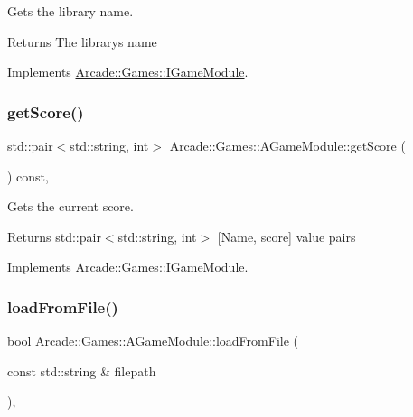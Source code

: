 Gets the library name. 

\begin{DoxyReturn}{Returns}
The library\textquotesingle{}s name 
\end{DoxyReturn}


Implements \mbox{\hyperlink{classArcade_1_1Games_1_1IGameModule_a30966cbaa00abbd2a211cf152ea595f2}{Arcade\+::\+Games\+::\+I\+Game\+Module}}.

\mbox{\label{classArcade_1_1Games_1_1AGameModule_a83dbf1572ae5e25174bc7b81fed7ba77}} 
\subsubsection{\texorpdfstring{getScore()}{getScore()}}
{\footnotesize\ttfamily std\+::pair$<$std\+::string, int$>$ Arcade\+::\+Games\+::\+A\+Game\+Module\+::get\+Score (\begin{DoxyParamCaption}{ }\end{DoxyParamCaption}) const\hspace{0.3cm}{\ttfamily [final]}, {\ttfamily [virtual]}}



Gets the current score. 

\begin{DoxyReturn}{Returns}
std\+::pair$<$std\+::string, int$>$ \mbox{[}Name, score\mbox{]} value pairs 
\end{DoxyReturn}


Implements \mbox{\hyperlink{classArcade_1_1Games_1_1IGameModule_ad84a0b04bb998a4eb3682c76d0fababf}{Arcade\+::\+Games\+::\+I\+Game\+Module}}.

\mbox{\label{classArcade_1_1Games_1_1AGameModule_a1f7e26d79d4c392458407edfe934ff5f}} 
\subsubsection{\texorpdfstring{loadFromFile()}{loadFromFile()}\hspace{0.1cm}{\footnotesize\ttfamily [1/2]}}
{\footnotesize\ttfamily bool Arcade\+::\+Games\+::\+A\+Game\+Module\+::load\+From\+File (\begin{DoxyParamCaption}\item[{const std\+::string \&}]{filepath }\end{DoxyParamCaption})\hspace{0.3cm}{\ttfamily [final]}, {\ttfamily [virtual]}}



